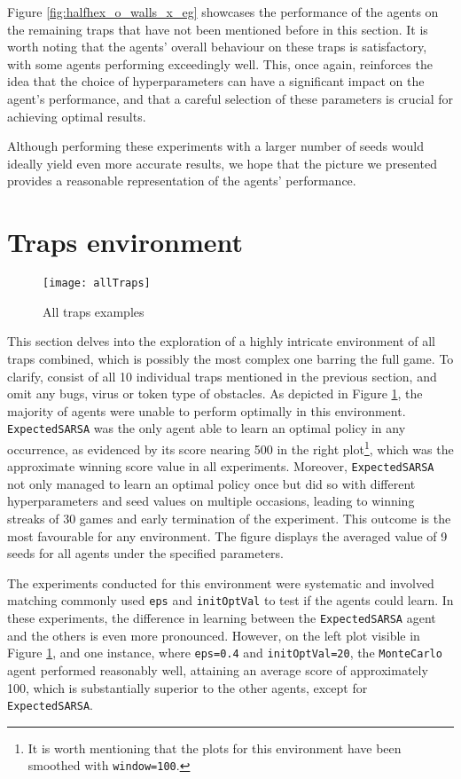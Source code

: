Figure \ref{fig:halfhex_o_walls_x_eg} showcases the performance of the agents on the remaining traps that have not been mentioned before in this section. It is worth noting that the agents' overall behaviour on these traps is satisfactory, with some agents performing exceedingly well. This, once again, reinforces the idea that the choice of hyperparameters can have a significant impact on the agent's performance, and that a careful selection of these parameters is crucial for achieving optimal results.

Although performing these experiments with a larger number of seeds would ideally yield even more accurate results, we hope that the picture we presented provides a reasonable representation of the agents' performance.

\section{Traps environment}
\begin{figure}[h]
    \centering
    \texttt{[image: allTraps]}
    \caption{All traps examples}
    \label{fig:alltraps_eg}
\end{figure}

This section delves into the exploration of a highly intricate environment of all traps combined, which is possibly the most complex one barring the full game. To clarify, consist of all 10 individual traps mentioned in the previous section, and omit any bugs, virus or token type of obstacles. As depicted in Figure \ref{fig:alltraps_eg}, the majority of agents were unable to perform optimally in this environment. \texttt{ExpectedSARSA} was the only agent able to learn an optimal policy in any occurrence, as evidenced by its score nearing 500 in the right plot\footnote{It is worth mentioning that the plots for this environment have been smoothed with \texttt{window=100}.}, which was the approximate winning score value in all experiments. Moreover, \texttt{ExpectedSARSA} not only managed to learn an optimal policy once but did so with different hyperparameters and seed values on multiple occasions, leading to winning streaks of 30 games and early termination of the experiment. This outcome is the most favourable for any environment. The figure displays the averaged value of 9 seeds for all agents under the specified parameters. 

The experiments conducted for this environment were systematic and involved matching commonly used \texttt{eps} and \texttt{initOptVal} to test if the agents could learn. In these experiments, the difference in learning between the \texttt{ExpectedSARSA} agent and the others is even more pronounced. However, on the left plot visible in Figure \ref{fig:alltraps_eg}, and one instance, where \texttt{eps=0.4} and \texttt{initOptVal=20}, the \texttt{MonteCarlo} agent performed reasonably well, attaining an average score of approximately 100, which is substantially superior to the other agents, except for \texttt{ExpectedSARSA}.

